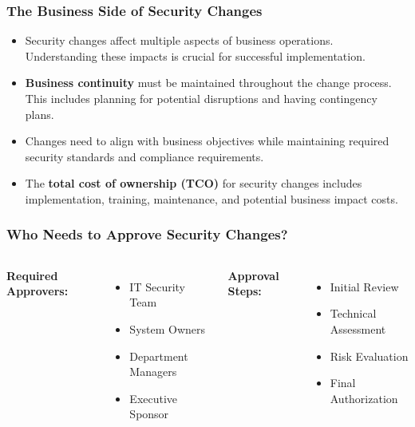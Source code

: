 \documentclass{beamer}
\begin{document}
\begin{frame}
\frametitle{The Business Side of Security Changes}
\begin{itemize}
    \item Security changes affect multiple aspects of business operations. Understanding these impacts is crucial for successful implementation.
    
    \item \textbf{Business continuity} must be maintained throughout the change process. This includes planning for potential disruptions and having contingency plans.
    
    \item Changes need to align with business objectives while maintaining required security standards and compliance requirements.
    
    \item The \textbf{total cost of ownership (TCO)} for security changes includes implementation, training, maintenance, and potential business impact costs.
\end{itemize}
\end{frame}

\begin{frame}
    \frametitle{Who Needs to Approve Security Changes?}
    \begin{columns}[t]
    \textbf{Required Approvers:}
    \begin{itemize}
        \item IT Security Team
        \item System Owners
        \item Department Managers
        \item Executive Sponsor
    \end{itemize}
    \textbf{Approval Steps:}
    \begin{itemize}
        \item Initial Review
        \item Technical Assessment
        \item Risk Evaluation
        \item Final Authorization
    \end{itemize}
    \end{columns}
    \end{frame}
    
\end{document}
